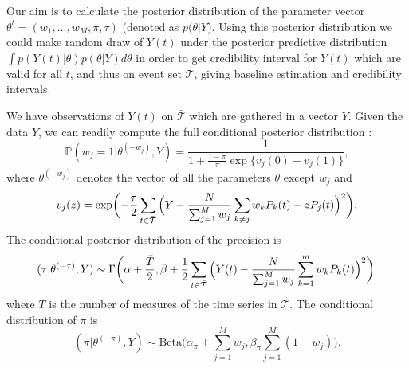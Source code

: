 \documentclass[journal]{IEEEtran}
\begin{document}
Our aim is to calculate the posterior distribution of the parameter
vector $\theta^t=(w_1,\dotsc,w_M,\pi,\tau)$ (denoted as
$p(\theta|Y$). Using this posterior distribution we could make random
draw of $Y(t)$ under the posterior predictive distribution $\int
p(Y(t) | \theta) p(\theta| Y)d\theta$ in order to get credibility
interval for $Y(t)$ which are valid for all $t$, and thus on event set
$\mathcal{T}$, giving baseline estimation and credibility intervals.

We have observations of $Y(t)$ on $\bar{\mathcal{T}}$ which are
gathered in a vector $Y$.  Given the data $Y$, we can readily compute
the full conditional posterior distribution :
\begin{equation}
  \label{cond:distributionWj}
  {\mathbb P}(w_j = 1 | \theta^{(-w_j)},Y) =
  \frac{1}{1+\frac{1-\pi}{\pi}\exp\{v_j(0)-v_j(1)\}},
\end{equation}
where $\theta^{(-w_j)}$ denotes the vector of all the parameters
$\theta$ except $w_j$ and
\begin{equation*}
  v_j(z) = \exp\biggl(-\frac{\tau}{2}
  \sum_{t\in \bar{\mathcal{T}}}{
    \Bigl(Y - \frac{N}{\sum_{j=1}^{M}{w_j}}\sum_{k \not = j} w_k P_k(t) - z P_j(t)\Bigr)^2 }\biggr).
\end{equation*}
The conditional posterior distribution of the precision is
\begin{equation}
  (\tau | \theta^{(-\tau)},Y)  \sim \Gamma\biggl(\alpha+\frac{\bar T}{2},\beta + \frac{1}{2}\sum_{t\in \bar{\mathcal{T}}}{\Bigl(Y(t) - \frac{N}{\sum_{j=1}^{M}{w_j}}\sum_{k=1}^m w_k P_k(t)\Bigr)^2}\biggl).
\label{cond:distributionTau}
\end{equation}
where $\bar T$ is the number of measures of the time series in
$\bar{\mathcal{T}}$. The conditional distribution of $\pi$ is
\begin{equation}
  (\pi | \theta^{(-\pi)},Y)  \sim \mathrm{Beta}\biggl(\alpha_\pi+\sum_{j=1}^{M}{w_j} ,\beta_\pi\sum_{j=1}^{M}{(1-w_j)}\biggr).\label{cond:distributionPi}
\end{equation}
\end{document}
